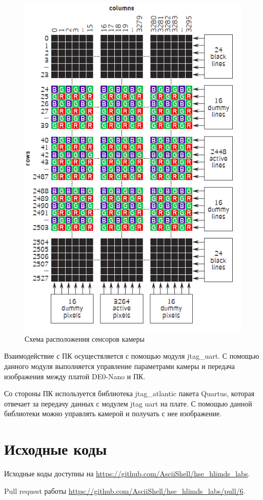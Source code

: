 \documentclass[a4paper,14pt]{article}
\begin{document}
	\begin{figure}[H]
		\centering
		\includegraphics[width=0.7\linewidth]{images/matrix}
		\caption{Схема расположения сенсоров камеры}
		\label{fig:matrix}
	\end{figure}
	
	
	Взаимодействие с ПК осуществляется с помощью модуля jtag\_uart.
	С помощью данного модуля выполняется управление параметрами камеры и передача изображения между платой DE0-Nano и ПК.
	
	Со стороны ПК используется библиотека jtag\_atlantic пакета Quartus, которая отвечает за передачу данных с модулем jtag uart на плате.
	С помощью данной библиотеки можно управлять камерой и получать с нее изображение.
	
    

    \section{Исходные коды}

    Исходные коды доступны на \href{https://github.com/AsciiShell/hse_hlimds_labs}
    {https://github.com/AsciiShell/hse\_hlimds\_labs}.

    Pull request работы \href{https://github.com/AsciiShell/hse_hlimds_labs/pull/6}
    {https://github.com/AsciiShell/hse\_hlimds\_labs/pull/6}.
\end{document}
